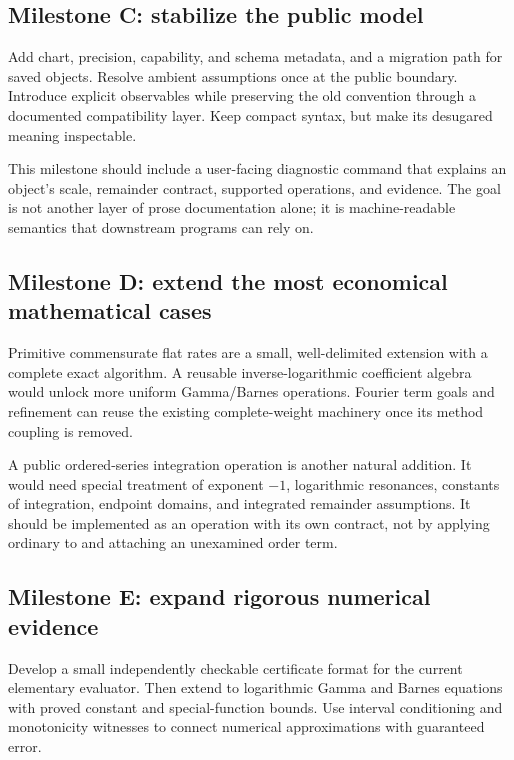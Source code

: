 \documentclass[11pt,a4paper]{article}
\newcommand{\code}[1]{\texttt{\detokenize{#1}}}
\theoremstyle{definition}
\begin{document}
\subsection{Milestone C: stabilize the public model}

Add chart, precision, capability, and schema metadata, and a migration path for saved objects. Resolve ambient assumptions once at the public boundary. Introduce explicit observables while preserving the old \code{"Power"} convention through a documented compatibility layer. Keep compact syntax, but make its desugared meaning inspectable.

This milestone should include a user-facing diagnostic command that explains an object's scale, remainder contract, supported operations, and evidence. The goal is not another layer of prose documentation alone; it is machine-readable semantics that downstream programs can rely on.

\subsection{Milestone D: extend the most economical mathematical cases}

Primitive commensurate flat rates are a small, well-delimited extension with a complete exact algorithm. A reusable inverse-logarithmic coefficient algebra would unlock more uniform Gamma/Barnes operations. Fourier term goals and refinement can reuse the existing complete-weight machinery once its method coupling is removed.

A public ordered-series integration operation is another natural addition. It would need special treatment of exponent $-1$, logarithmic resonances, constants of integration, endpoint domains, and integrated remainder assumptions. It should be implemented as an operation with its own contract, not by applying ordinary \code{Integrate} to \code{Normal[s]} and attaching an unexamined order term.

\subsection{Milestone E: expand rigorous numerical evidence}

Develop a small independently checkable certificate format for the current elementary evaluator. Then extend to logarithmic Gamma and Barnes equations with proved constant and special-function bounds. Use interval conditioning and monotonicity witnesses to connect numerical approximations with guaranteed error.
\end{document}
